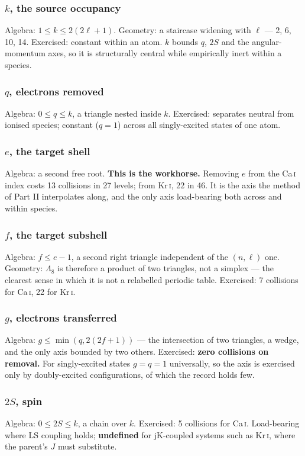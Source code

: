 \documentclass[11pt,a4paper]{article}
\theoremstyle{definition}
\newcommand{\Le}{\ensuremath{\Lambda_{8}}}
\begin{document}
\subsubsection*{$k$, the source occupancy}
Algebra: $1\le k\le 2(2\ell+1)$. Geometry: a staircase widening with $\ell$ ---
2, 6, 10, 14. Exercised: constant within an atom. $k$ bounds $q$, $2S$ and the
angular-momentum axes, so it is structurally central while empirically inert
within a species.

\subsubsection*{$q$, electrons removed}
Algebra: $0\le q\le k$, a triangle nested inside $k$. Exercised: separates
neutral from ionised species; constant ($q=1$) across all singly-excited states
of one atom.

\subsubsection*{$e$, the target shell}
Algebra: a second free root. \textbf{This is the workhorse.} Removing $e$ from
the Ca\,\textsc{i} index costs 13 collisions in 27 levels; from
Kr\,\textsc{i}, 22 in 46. It is the axis the method of Part II interpolates
along, and the only axis load-bearing both across and within species.

\subsubsection*{$f$, the target subshell}
Algebra: $f\le e-1$, a second right triangle independent of the $(n,\ell)$ one.
Geometry: \Le{} is therefore a product of two triangles, not a simplex --- the
clearest sense in which it is not a relabelled periodic table. Exercised: 7
collisions for Ca\,\textsc{i}, 22 for Kr\,\textsc{i}.

\subsubsection*{$g$, electrons transferred}
Algebra: $g\le\min(q,2(2f+1))$ --- the intersection of two triangles, a wedge,
and the only axis bounded by two others. Exercised: \textbf{zero collisions on
removal.} For singly-excited states $g=q=1$ universally, so the axis is
exercised only by doubly-excited configurations, of which the record holds few.

\subsubsection*{$2S$, spin}
Algebra: $0\le 2S\le k$, a chain over $k$. Exercised: 5 collisions for
Ca\,\textsc{i}. Load-bearing where LS coupling holds; \textbf{undefined} for
jK-coupled systems such as Kr\,\textsc{i}, where the parent's $J$ must
substitute.
\end{document}
